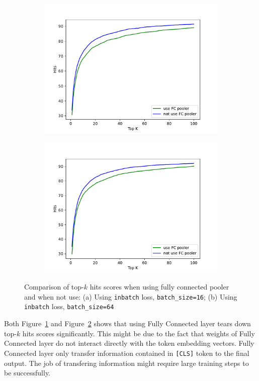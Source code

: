 \documentclass[12pt, sort&compress]{report}
\begin{document}
\begin{figure}[!htbp]
	\begin{subfigure}{.5\linewidth}
		\centering
		\includegraphics[scale=.45]{images/PDF/experiments/poolerCompare_batch16.pdf}
		\caption{}
		\label{fig:20:a}
	\end{subfigure}
	\begin{subfigure}{.5\linewidth}
		\centering
		\includegraphics[scale=.45]{images/PDF/experiments/poolerCompare_batch64.pdf}
		\caption{}
		\label{fig:20:b}
	\end{subfigure}
	\caption{Comparison of top-$k$ hits scores when using fully connected pooler and when not use: (a) Using {\tt inbatch} loss, {\tt batch\_size=16}; (b) Using {\tt inbatch} loss, {\tt batch\_size=64}}
	\label{fig:20}
\end{figure} 
\par Both Figure~\ref{fig:20:a} and Figure~\ref{fig:20:b} shows that using Fully Connected layer tears down top-$k$ hits scores significantly. This might be due to the fact that weights of Fully Connected layer do not interact directly with the token embedding vectors. Fully Connected layer only transfer information contained in {\tt [CLS]} token to the final output. The job of transfering information might require large training steps to be successfully.
\end{document}
